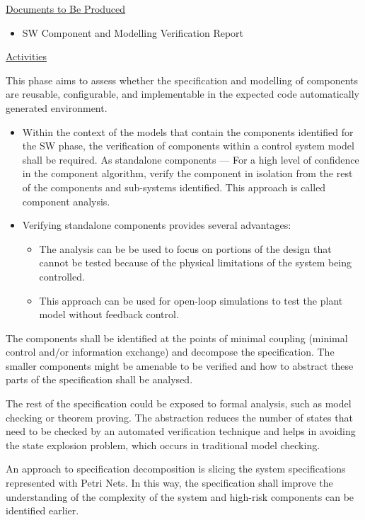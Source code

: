 \underline{Documents to Be Produced} 

\begin{itemize}
\item SW Component and Modelling Verification Report
\end{itemize}

\underline{Activities}

This phase aims to assess whether the specification and modelling of
components are reusable, configurable, and implementable in the
expected code automatically generated environment.

\begin{itemize}
\item Within the context of the models that contain the components
  identified for the SW phase, the verification of components within a
  control system model shall be required.  As standalone components ---
  For a high level of confidence in the component algorithm, verify
  the component in isolation from the rest of the components and
  sub-systems identified. This approach is called component analysis.
\item Verifying standalone components provides several advantages:
\begin{itemize}
\item The analysis can be be used to focus on portions of the design
  that cannot be tested because of the physical limitations of the
  system being controlled.
\item This approach can be used for open-loop simulations to test the
  plant model without feedback control.
\end{itemize}
\end{itemize}

The components shall be identified at the points of minimal coupling
(minimal control and/or information exchange) and decompose the
specification. The smaller components might be amenable to be verified
and how to abstract these parts of the specification shall be
analysed.

The rest of the specification could be exposed to formal analysis,
such as model checking or theorem proving. The abstraction reduces the
number of states that need to be checked by an automated verification
technique and helps in avoiding the state explosion problem, which
occurs in traditional model checking.

An approach to specification decomposition is slicing the system
specifications represented with Petri Nets. In this way, the
specification shall improve the understanding of the complexity of the
system and high-risk components can be identified earlier.

